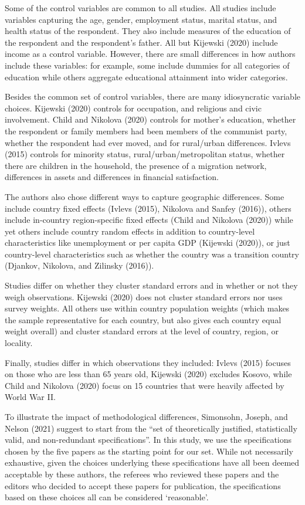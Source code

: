 \documentclass[
  letterpaper,
  DIV=11,
  numbers=noendperiod]{scrartcl}
\begin{document}
Some of the control variables are common to all studies. All studies
include variables capturing the age, gender, employment status, marital
status, and health status of the respondent. They also include measures
of the education of the respondent and the respondent's father. All but
Kijewski (2020) include income as a control variable. However, there are
small differences in how authors include these variables: for example,
some include dummies for all categories of education while others
aggregate educational attainment into wider categories.

Besides the common set of control variables, there are many
idiosyncratic variable choices. Kijewski (2020) controls for occupation,
and religious and civic involvement. Child and Nikolova (2020) controls
for mother's education, whether the respondent or family members had
been members of the communist party, whether the respondent had ever
moved, and for rural/urban differences. Ivlevs (2015) controls for
minority status, rural/urban/metropolitan status, whether there are
children in the household, the presence of a migration network,
differences in assets and differences in financial satisfaction.

The authors also chose different ways to capture geographic differences.
Some include country fixed effects (Ivlevs (2015), Nikolova and Sanfey
(2016)), others include in-country region-specific fixed effects (Child
and Nikolova (2020)) while yet others include country random effects in
addition to country-level characteristics like unemployment or per
capita GDP (Kijewski (2020)), or just country-level characteristics such
as whether the country was a transition country (Djankov, Nikolova, and
Zilinsky (2016)).

Studies differ on whether they cluster standard errors and in whether or
not they weigh observations. Kijewski (2020) does not cluster standard
errors nor uses survey weights. All others use within country population
weights (which makes the sample representative for each country, but
also gives each country equal weight overall) and cluster standard
errors at the level of country, region, or locality.

Finally, studies differ in which observations they included: Ivlevs
(2015) focuses on those who are less than 65 years old, Kijewski (2020)
excludes Kosovo, while Child and Nikolova (2020) focus on 15 countries
that were heavily affected by World War II.

To illustrate the impact of methodological differences, Simonsohn,
Joseph, and Nelson (2021) suggest to start from the ``set of
theoretically justified, statistically valid, and non-redundant
specifications''. In this study, we use the specifications chosen by the
five papers as the starting point for our set. While not necessarily
exhaustive, given the choices underlying these specifications have all
been deemed acceptable by these authors, the referees who reviewed these
papers and the editors who decided to accept these papers for
publication, the specifications based on these choices all can be
considered `reasonable'.
\end{document}

